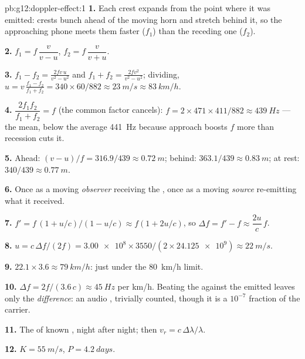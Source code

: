 \begin{solution}{pb:g12:doppler-effect:1}
\textbf{1.} Each crest expands from the point where it was emitted: crests bunch ahead
of the moving horn and stretch behind it, so the approaching phone meets them faster
($f_1$) than the receding one ($f_2$).

\textbf{2.} $f_1 = f\,\dfrac{v}{v - u}$, \quad $f_2 = f\,\dfrac{v}{v + u}$.

\textbf{3.} $f_1 - f_2 = \frac{2fv\,u}{v^2 - u^2}$ and $f_1 + f_2 =
\frac{2fv^2}{v^2 - u^2}$; dividing, $u = v\,\frac{f_1 - f_2}{f_1 + f_2} =
340 \times 60/882 \approx \qty{23}{m/s} \approx \qty{83}{km/h}$.

\textbf{4.} $\dfrac{2f_1 f_2}{f_1 + f_2} = f$ (the common factor cancels):
$f = 2 \times 471 \times 411/882 \approx \qty{439}{Hz}$ --- the  mean, below
the average \qty{441}{Hz} because approach boosts $f$ more than recession cuts it.

\textbf{5.} Ahead: $(v - u)/f = 316.9/439 \approx \qty{0.72}{m}$; behind:
$363.1/439 \approx \qty{0.83}{m}$; at rest: $340/439 \approx \qty{0.77}{m}$.

\textbf{6.} Once as a moving \emph{observer} receiving the , once as a moving
\emph{source} re-emitting what it received.

\textbf{7.} $f' = f\,(1 + u/c)/(1 - u/c) \approx f(1 + 2u/c)$, so
$\Delta f = f' - f \approx \dfrac{2u}{c}\,f$.

\textbf{8.} $u = c\,\Delta f/(2f) = \num{3.00e8} \times 3550/(2 \times \num{24.125e9})
\approx \qty{22}{m/s}$.

\textbf{9.} $22.1 \times 3.6 \approx \qty{79}{km/h}$: just under the \qty{80}{km/h}
limit.

\textbf{10.} $\Delta f = 2f/(3.6\,c) \approx \qty{45}{Hz}$ per \unit{km/h}. Beating the
 against the emitted  leaves only the \emph{difference}: an audio ,
trivially counted, though it is a $10^{-7}$ fraction of the carrier.

\textbf{11.} The  of known , night after night; then
$v_r = c\,\Delta\lambda/\lambda$.

\textbf{12.} $K = \qty{55}{m/s}$, $P = \qty{4.2}{days}$.


\end{solution}
